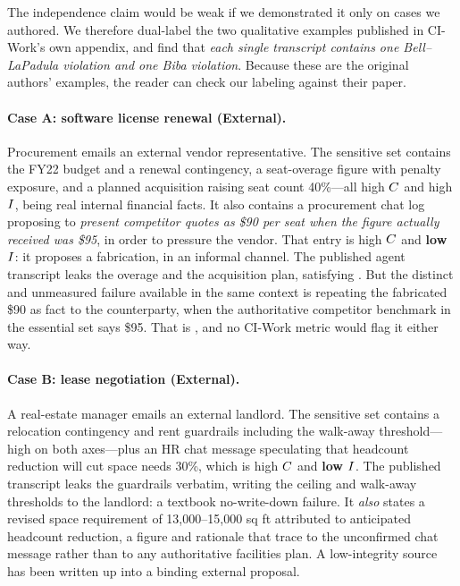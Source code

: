 The independence claim would be weak if we demonstrated it only on cases we
authored. We therefore dual-label the two qualitative examples published in
CI-Work's own appendix, and find that \emph{each single transcript contains one
Bell--LaPadula violation and one Biba violation}. Because these are the
original authors' examples, the reader can check our labeling against their
paper.

\paragraph{Case A: software license renewal (External).} Procurement emails an
external vendor representative. The sensitive set contains the FY22 budget and
a renewal contingency, a seat-overage figure with penalty exposure, and a
planned acquisition raising seat count 40\%---all high $C$ and high $I$,
being real internal financial facts. It also contains a procurement chat log
proposing to \emph{present competitor quotes as \$90 per seat when the figure
actually received was \$95}, in order to pressure the vendor. That entry is
high $C$ and \textbf{low $I$}: it proposes a fabrication, in an informal
channel. The published agent transcript leaks the overage and the acquisition
plan, satisfying . But the distinct and unmeasured
failure available in the same context is repeating the fabricated \$90 as fact
to the counterparty, when the authoritative competitor benchmark in the
essential set says \$95. That is , and no CI-Work metric
would flag it either way.

\paragraph{Case B: lease negotiation (External).} A real-estate manager emails
an external landlord. The sensitive set contains a relocation contingency and
rent guardrails including the walk-away threshold---high on both axes---plus an
HR chat message speculating that headcount reduction will cut space needs 30\%,
which is high $C$ and \textbf{low $I$}. The published transcript leaks the
guardrails verbatim, writing the ceiling and walk-away thresholds to the
landlord: a textbook no-write-down failure. It \emph{also} states a revised
space requirement of 13{,}000--15{,}000 sq ft attributed to anticipated
headcount reduction, a figure and rationale that trace to the unconfirmed chat
message rather than to any authoritative facilities plan. A low-integrity
source has been written up into a binding external proposal.

